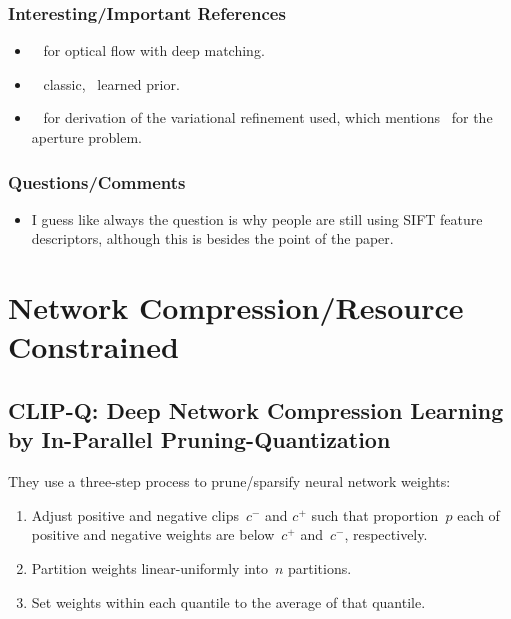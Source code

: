 \documentclass[a4paper, 12pt]{article}
\begin{document}
\subsubsection{Interesting/Important References}

\begin{itemize}
        \item~\cite{weinzaepfel2013deepflow} for optical flow with deep matching.

        \item~\cite{brox2011large} classic,~\cite{wulff2015efficient} learned
                prior.

        \item~\cite{zimmer2011optic} for derivation of the variational
                refinement used, which mentions~\cite{bertero1988illposed} for
                the aperture problem.
\end{itemize}


\subsubsection{Questions/Comments}

\begin{itemize}
        \item I guess like always the question is why people are still using
                SIFT feature descriptors, although this is besides the point of
                the paper.
\end{itemize}


\section{Network Compression/Resource Constrained}

\subsection{CLIP-Q: Deep Network Compression Learning by In-Parallel
            Pruning-Quantization~\cite{Tung_2018_CVPR}}

They use a three-step process to prune/sparsify neural network weights:

\begin{enumerate}
        \item Adjust positive and negative clips~$c^-$ and $c^+$ such that
                proportion~$p$ each of positive and negative weights are
                below~$c^+$ and~$c^-$, respectively.

        \item Partition weights linear-uniformly into~$n$ partitions.

        \item Set weights within each quantile to the average of that quantile.
\end{enumerate}
\end{document}
